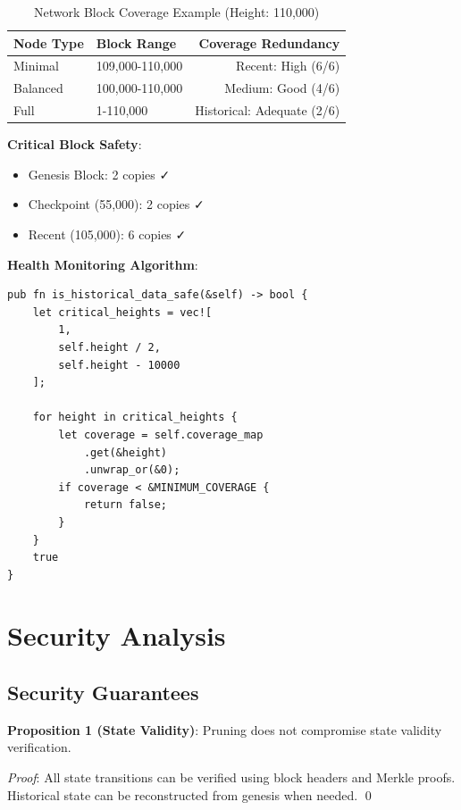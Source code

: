 \documentclass[11pt,a4paper]{article}
\begin{document}
\begin{table}[h]
\centering
\begin{tabular}{llr}
\toprule
\textbf{Node Type} & \textbf{Block Range} & \textbf{Coverage Redundancy} \\
\midrule
Minimal & 109,000-110,000 & Recent: High (6/6) \\
Balanced & 100,000-110,000 & Medium: Good (4/6) \\
Full & 1-110,000 & Historical: Adequate (2/6) \\
\bottomrule
\end{tabular}
\caption{Network Block Coverage Example (Height: 110,000)}
\end{table}

\textbf{Critical Block Safety}:
\begin{itemize}
\item Genesis Block: 2 copies ✓
\item Checkpoint (55,000): 2 copies ✓
\item Recent (105,000): 6 copies ✓
\end{itemize}

\textbf{Health Monitoring Algorithm}:

\begin{lstlisting}
pub fn is_historical_data_safe(&self) -> bool {
    let critical_heights = vec![
        1,
        self.height / 2,
        self.height - 10000
    ];

    for height in critical_heights {
        let coverage = self.coverage_map
            .get(&height)
            .unwrap_or(&0);
        if coverage < &MINIMUM_COVERAGE {
            return false;
        }
    }
    true
}
\end{lstlisting}

\section{Security Analysis}

\subsection{Security Guarantees}

\textbf{Proposition 1 (State Validity)}: Pruning does not compromise state validity verification.

\textit{Proof}: All state transitions can be verified using block headers and Merkle proofs. Historical state can be reconstructed from genesis when needed. \qed
\end{document}
